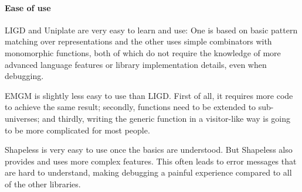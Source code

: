 \paragraph{Ease of use}
LIGD and Uniplate are very easy to learn and use: One is based on basic
pattern matching over representations and the other uses simple combinators
with monomorphic functions, both of which do not require the knowledge of
more advanced language features or library implementation details, even
when debugging.

EMGM is slightly less easy to use than LIGD. First of all, it requires more
code to achieve the same result; secondly, functions need to be extended to
sub-universes; and thirdly, writing the generic function in a visitor-like
way is going to be more complicated for most people.

Shapeless is very easy to use once the basics are understood. But Shapeless
also provides and uses more complex features. This often leads to error messages
that are hard to understand, making debugging a painful experience compared to
all of the other libraries.
